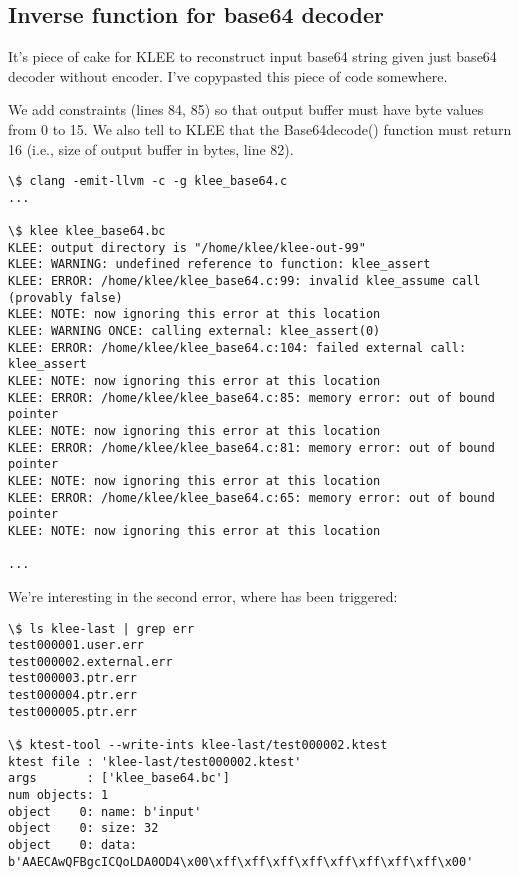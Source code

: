 \subsection{Inverse function for base64 decoder}

It's piece of cake for KLEE to reconstruct input base64 string given just base64 decoder without encoder.
I've copypasted this piece of code somewhere.

We add constraints (lines 84, 85) so that output buffer must have byte values from 0 to 15.
We also tell to KLEE that the Base64decode() function must return 16 (i.e., size of output buffer in bytes, line 82).



\begin{lstlisting}
\$ clang -emit-llvm -c -g klee_base64.c
...

\$ klee klee_base64.bc
KLEE: output directory is "/home/klee/klee-out-99"
KLEE: WARNING: undefined reference to function: klee_assert
KLEE: ERROR: /home/klee/klee_base64.c:99: invalid klee_assume call (provably false)
KLEE: NOTE: now ignoring this error at this location
KLEE: WARNING ONCE: calling external: klee_assert(0)
KLEE: ERROR: /home/klee/klee_base64.c:104: failed external call: klee_assert
KLEE: NOTE: now ignoring this error at this location
KLEE: ERROR: /home/klee/klee_base64.c:85: memory error: out of bound pointer
KLEE: NOTE: now ignoring this error at this location
KLEE: ERROR: /home/klee/klee_base64.c:81: memory error: out of bound pointer
KLEE: NOTE: now ignoring this error at this location
KLEE: ERROR: /home/klee/klee_base64.c:65: memory error: out of bound pointer
KLEE: NOTE: now ignoring this error at this location

...
\end{lstlisting}

We're interesting in the second error, where  has been triggered:

\begin{lstlisting}
\$ ls klee-last | grep err
test000001.user.err
test000002.external.err
test000003.ptr.err
test000004.ptr.err
test000005.ptr.err

\$ ktest-tool --write-ints klee-last/test000002.ktest
ktest file : 'klee-last/test000002.ktest'
args       : ['klee_base64.bc']
num objects: 1
object    0: name: b'input'
object    0: size: 32
object    0: data: b'AAECAwQFBgcICQoLDA0OD4\x00\xff\xff\xff\xff\xff\xff\xff\xff\x00'
\end{lstlisting}

